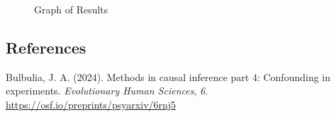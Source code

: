 \documentclass[
  single column]{article}
\newlength{\cslhangindent}
\newenvironment{CSLReferences}[2] %
 {\begin{list}{}{%
  \setlength{\itemindent}{0pt}
  \setlength{\leftmargin}{0pt}
  \setlength{\parsep}{0pt}
  \ifodd #1
   \setlength{\leftmargin}{\cslhangindent}
   \setlength{\itemindent}{-1\cslhangindent}
  \fi
  \setlength{\itemsep}{#2\baselineskip}}}
 {\end{list}}
\begin{document}
\begin{figure}


\caption{\label{fig-1_1}Graph of Results}

\end{figure}%

\newpage{}

\subsection*{References}\label{references}

\label{refs}
\begin{CSLReferences}{1}{0}
Bulbulia, J. A. (2024). Methods in causal inference part 4: Confounding
in experiments. \emph{Evolutionary Human Sciences}, \emph{6}.
\url{https://osf.io/preprints/psyarxiv/6rnj5}

\end{CSLReferences}
\end{document}
